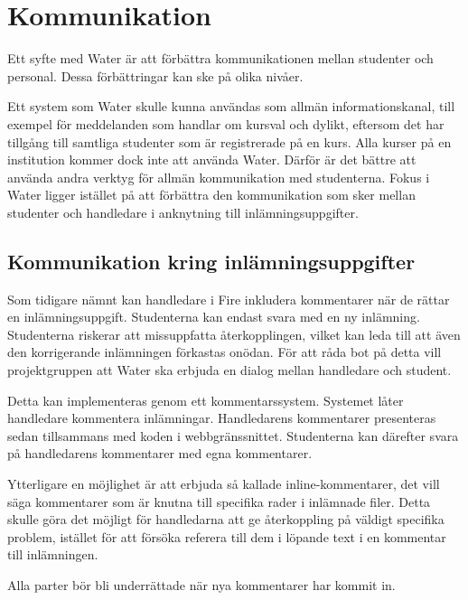 \section{Kommunikation}

Ett syfte med Water är att förbättra kommunikationen mellan studenter och personal. Dessa förbättringar kan ske på olika nivåer.

Ett system som Water skulle kunna användas som allmän informationskanal, till exempel för meddelanden som handlar om kursval och dylikt,  eftersom det har tillgång till samtliga studenter som är registrerade på en kurs. Alla kurser på en institution kommer dock inte att använda Water. Därför är det bättre att använda andra verktyg för allmän kommunikation med studenterna. Fokus i Water ligger istället på att förbättra den kommunikation som sker mellan studenter och handledare i anknytning till inlämningsuppgifter.

\subsection{Kommunikation kring inlämningsuppgifter}
Som tidigare nämnt kan handledare i Fire inkludera kommentarer när de rättar en inlämningsuppgift. Studenterna kan endast svara med en ny inlämning. Studenterna riskerar att missuppfatta återkopplingen, vilket kan leda till att även den korrigerande inlämningen förkastas onödan. För att råda bot på detta vill projektgruppen att Water ska erbjuda en dialog mellan handledare och student.

Detta kan implementeras genom ett kommentarssystem. Systemet låter handledare kommentera inlämningar. Handledarens kommentarer presenteras sedan tillsammans med koden i webbgränssnittet. Studenterna kan därefter svara på handledarens kommentarer med egna kommentarer.

Ytterligare en möjlighet är att erbjuda så kallade inline-kommentarer, det vill säga kommentarer som är knutna till specifika rader i inlämnade filer. Detta skulle göra det möjligt för handledarna att ge återkoppling på väldigt specifika problem, istället för att försöka referera till dem i löpande text i en kommentar till inlämningen.

Alla parter bör bli underrättade när nya kommentarer har kommit in.
